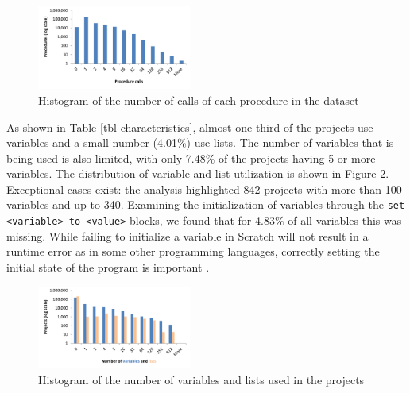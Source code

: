 \documentclass{sig-alternate}
\begin{document}
\begin{figure}
	\centering
	\includegraphics[width=0.45\textwidth]{fig/charts/7procedurecalls}
	\caption{Histogram of the number of calls of each procedure in the dataset}
	\label{fig:procedurecalls}
\end{figure}

As shown in Table \ref{tbl-characteristics}, almost one-third of the projects use variables and a small number (4.01\%) use lists. The number of variables that is being used is also limited, with only 7.48\% of the projects having 5 or more variables. The distribution of variable and list utilization is shown in Figure \ref{fig:variables}. Exceptional cases exist: the analysis highlighted 842 projects with more than 100 variables and up to 340. Examining the initialization of variables through the \texttt{set <variable> to <value>} blocks, we found that for 4.83\% of all variables this was missing. While failing to initialize a variable in Scratch will not result in a runtime error as in some other programming languages, correctly setting the initial state of the program is important \cite{boe_hairball:_2013}.


\begin{figure}
	\centering
	\includegraphics[width=0.45\textwidth]{fig/charts/8variableslists}
	\caption{Histogram of the number of variables and lists used in the projects}
	\label{fig:variables}
\end{figure}
\end{document}
